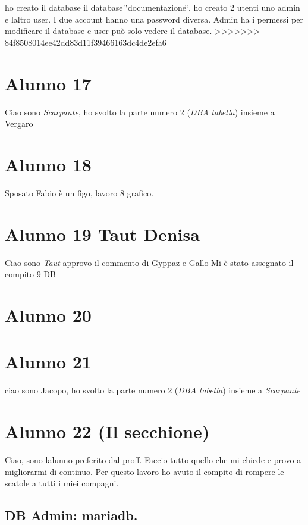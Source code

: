 ho creato il database il database \char`\"{}documentazione\char`\"{}, ho creato 2 utenti uno \textquotesingle{}admin\textquotesingle{} e l\textquotesingle{}altro \textquotesingle{}user\textquotesingle{}. I due account hanno una password diversa. Admin ha i permessi per modificare il database e user può solo vedere il database.
>>>>>>> 84f8508014ee42dd83d11f39466163dc4de2efa6

\section*{Alunno 17}

Ciao sono {\itshape Scarpante}, ho svolto la parte numero 2 ({\itshape D\+BA} {\itshape tabella}) insieme a Vergaro \section*{Alunno 18}

Sposato Fabio è un figo, lavoro 8 grafico. \section*{Alunno 19 Taut Denisa}

Ciao sono {\itshape Taut} approvo il commento di Gyppaz e Gallo Mi è stato assegnato il compito 9 DB \section*{Alunno 20}

\section*{Alunno 21}

ciao sono Jacopo, ho svolto la parte numero 2 ({\itshape D\+BA} {\itshape tabella}) insieme a {\itshape Scarpante}

\section*{Alunno 22 (Il secchione)}

Ciao, sono l\textquotesingle{}alunno preferito dal proff. Faccio tutto quello che mi chiede e provo a migliorarmi di continuo. Per questo lavoro ho avuto il compito di rompere le scatole a tutti i miei compagni.

\subsection*{DB Admin\+: mariadb.}

